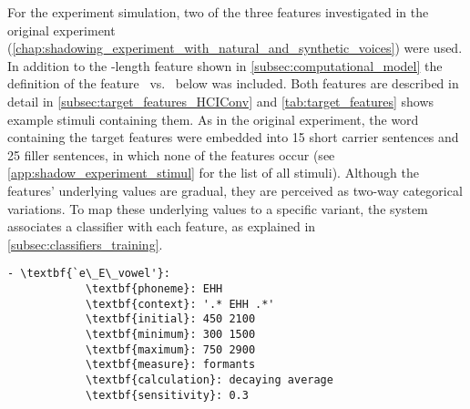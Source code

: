 For the experiment simulation, two of the three features investigated in the original experiment (\cref{chap:shadowing_experiment_with_natural_and_synthetic_voices}) were used.
In addition to the -length feature shown in \cref{subsec:computational_model} the definition of the feature \textipa{[E:]}~vs.~\textipa{[e:]} below was included.
Both features are described in detail in \cref{subsec:target_features_HCIConv} and \cref{tab:target_features} shows example stimuli containing them.
As in the original experiment, the word containing the target features were embedded into 15 short carrier sentences and 25 filler sentences, in which none of the features occur (see \cref{app:shadow_experiment_stimul} for the list of all stimuli).
Although the features' underlying values are gradual, they are perceived as two-way categorical variations.
To map these underlying values to a specific variant, the system associates a classifier with each feature, as explained in \cref{subsec:classifiers_training}.
%
%
\begin{Verbatim}[tabsize=4, commandchars=\\\{\}]
	- \textbf{`e\_E\_vowel'}:
			\textbf{phoneme}: EHH
			\textbf{context}: '.* EHH .*'
			\textbf{initial}: 450 2100
			\textbf{minimum}: 300 1500
			\textbf{maximum}: 750 2900
			\textbf{measure}: formants
			\textbf{calculation}: decaying average
			\textbf{sensitivity}: 0.3
\end{Verbatim}
%

